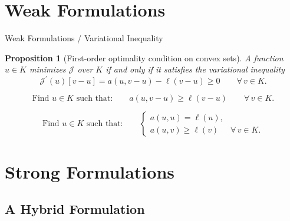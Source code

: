 \documentclass[10pt,aspectratio=169]{beamer}
\newtheorem{proposition}{Proposition}[section]
\def\cJ{{\mathcal J}}
\begin{document}
\section{Weak Formulations}

\begin{frame}{Weak Formulations / Variational Inequality}
	\vfill
	\begin{proposition}[First-order optimality condition on convex sets]
		A function $u\in K$ minimizes $\cJ$ over $K$ if and only if it satisfies the variational inequality
		\begin{equation*}
			\cJ^\prime(u)[v-u] =  a(u,v-u)-\ell(v-u) \ge 0\qquad\forall\, v\in K.
		\end{equation*}
	\end{proposition}
	\vfill
	\begin{problem}
	\begin{equation*}
		\text{Find }u\in K\text{ such that:}\qquad a(u,v-u)\ge \ell(v-u)\qquad \forall\, v\in K.
	\end{equation*}
	\end{problem}
	\vfill
	\begin{problem}
	\begin{equation*}
		\text{Find }u\in K\text{ such that:}\qquad
		\begin{cases}
			a(u,u) = \ell(u), &                   \\[2pt]
			a(u,v)\ge \ell(v) & \forall\, v\in K.
		\end{cases}
	\end{equation*}
	\end{problem}
	\vfill
\end{frame}

\section{Strong Formulations}

\subsection{A Hybrid Formulation}
\end{document}
